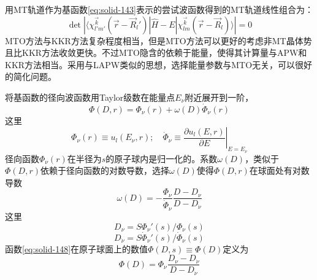 用MT轨道作为基函数\eqref{eq:solid-143}表示的尝试波函数得到的MT轨道线性组合为：
\begin{equation}
  \det|\langle\chi_{l'm'}^{\vec k}(\vec r-\vec R_l')|\hat H-E|\chi_{lm}^{\vec k}(\vec r-\vec R_l)\rangle|=0
  \label{eq:solid-147}
\end{equation}
MTO方法与KKR方法复杂程度相当，但是MTO方法可以更好的考虑非MT晶体势且比KKR方法收敛更快。不过MTO隐含的依赖于能量，使得其计算量与APW和KKR方法相当。采用与LAPW类似的思想，选择能量参数与MTO无关，可以很好的简化问题\cite{PRB12-3060_1975}。

将基函数的径向波函数用Taylor级数在能量点$E_{\nu}$附近展开到一阶，
\begin{equation}
  \Phi(D,r)=\Phi_{\nu}(r)+\omega(D)\dot\Phi_{\nu}(r)
  \label{eq:solid-148}
\end{equation}
这里
$$\Phi_{\nu}(r)\equiv u_l(E_{\nu},r);\quad\dot\Phi_{\nu}\equiv\left.\frac{\partial u_l(E,r)}{\partial E}\right|_{E=E_{\nu}}$$
径向函数$\Phi_{\nu}(r)$在半径为$s$的原子球内是归一化的。系数$\omega(D)$，类似于$\Phi(D,r)$依赖于径向函数的对数导数，选择$\omega(D)$使得$\Phi(D,r)$在球面处有对数导数
\begin{equation}
  \omega(D)=-\frac{\Phi_{\nu}}{\dot\Phi_{\nu}}\frac{D-D_{\nu}}{D-D_{\dot\nu}}
  \label{eq:solid-149}
\end{equation}
这里
\begin{equation}
  D_{\nu}=S\Phi_{\nu}'(s)/\Phi_{\nu}(s)
  \label{equation-150}
\end{equation}
\begin{equation}
  D_{\dot\nu}=S\dot\Phi_{\nu}'(s)/\dot\Phi_{\nu}(s)
  \label{eq:solid-151}
\end{equation}
函数\eqref{eq:solid-148}在原子球面上的数值$\Phi(D,s)\equiv\Phi(D)$定义为
\begin{equation}
  \Phi(D)=\Phi_{\nu}\frac{D_{\nu}-D_{\dot\nu}}{D-D_{\dot\nu}}
  \label{eq:solid-152}
\end{equation}

